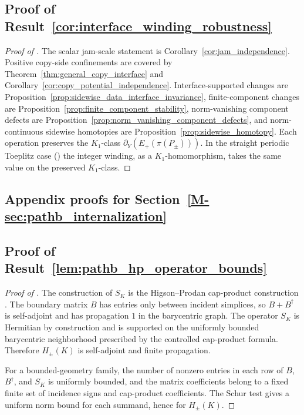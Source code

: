 \documentclass[11pt]{article}
\numberwithin{equation}{section}
\theoremstyle{definition}
\theoremstyle{remark}
\begin{document}
\subsection{Proof of Result~\ref{cor:interface_winding_robustness}}\label{app:proof:cor:interface_winding_robustness}
\begin{proof}[Proof of ]
The scalar jam-scale statement is Corollary~\ref{cor:jam_independence}. Positive copy-side
confinements are covered by Theorem~\ref{thm:general_copy_interface} and
Corollary~\ref{cor:copy_potential_independence}. Interface-supported changes are
Proposition~\ref{prop:sidewise_data_interface_invariance}, finite-component changes are
Proposition~\ref{prop:finite_component_stability}, norm-vanishing component defects are
Proposition~\ref{prop:norm_vanishing_component_defects}, and norm-continuous sidewise homotopies are
Proposition~\ref{prop:sidewise_homotopy}. Each operation preserves the \(K_1\)-class
\(\partial_Y(E_+(\pi(P_\pm)))\). In the straight periodic Toeplitz case
() the integer winding, as a \(K_1\)-homomorphism, takes the
same value on the preserved \(K_1\)-class.
\end{proof}

\subsection{Appendix proofs for Section~\ref{M-sec:pathb_internalization}}\label{app:pathb_proofs}

\subsection{Proof of Result~\ref{lem:pathb_hp_operator_bounds}}\label{app:proof:lem:pathb_hp_operator_bounds}
\begin{proof}[Proof of ]
The construction of \(S_K\) is the Higson--Prodan cap-product construction
\cite{HigsonProdanUniversalPRL,HigsonProdanUniversalArxiv}. The boundary matrix \(B\) has entries
only between incident simplices, so \(B+B^\dagger\) is self-adjoint and has propagation \(1\) in the
barycentric graph. The operator \(S_K\) is Hermitian by construction and is supported on the
uniformly bounded barycentric neighborhood prescribed by the controlled cap-product formula.
Therefore \(H_\pm(K)\) is self-adjoint and finite propagation.

For a bounded-geometry family, the number of nonzero entries in each row of \(B\), \(B^\dagger\),
and \(S_K\) is uniformly bounded, and the matrix coefficients belong to a fixed finite set of
incidence signs and cap-product coefficients. The Schur test gives a uniform norm bound for each
summand, hence for \(H_\pm(K)\).
\end{proof}
\end{document}
